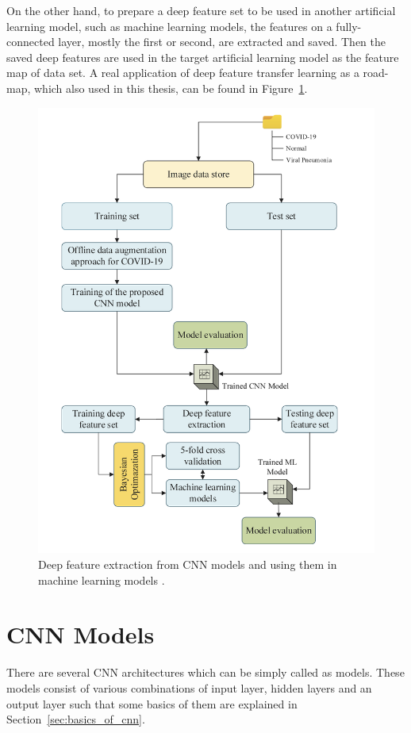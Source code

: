On the other hand, to prepare a deep feature set to be used in another artificial learning model, such as machine learning models, the features on a fully-connected layer, mostly the first or second, are extracted and saved. Then the saved deep features are used in the target artificial learning model as the feature map of data set. A real application of deep feature transfer learning as a road-map, which also used in this thesis, can be found in Figure~\ref{fig:A_novelCNNModel_architecture}.

\begin{figure}[h]
    \centering
    \includegraphics[width=.8\linewidth]{fig/deepfeauter_usage.png}
    \caption{Deep feature extraction from CNN models and using them in machine learning models \cite{A_novelCNNModel}.}
    \label{fig:A_novelCNNModel_architecture}
\end{figure}

\section{CNN Models}

There are several CNN architectures which can be simply called as models. These models consist of various combinations of input layer, hidden layers and an output layer such that some basics of them are explained in Section~\ref{sec:basics_of_cnn}.

